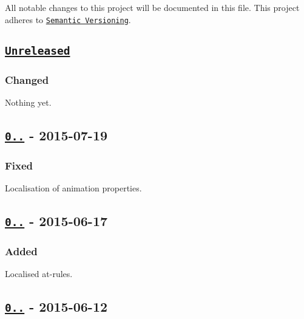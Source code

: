 All notable changes to this project will be documented in this file. This project adheres to \href{http://semver.org/}{\tt Semantic Versioning}.

\subsection*{\href{https://github.com/postcss-modules-local-by-default/compare/v0.0.10...HEAD}{\tt Unreleased}}

\subsubsection*{Changed}


\begin{DoxyItemize}
\item Nothing yet.
\end{DoxyItemize}

\subsection*{\href{https://github.com/postcss-modules-local-by-default/compare/v0.0.10...v0.0.11}{\tt 0..} -\/ 2015-\/07-\/19}

\subsubsection*{Fixed}


\begin{DoxyItemize}
\item Localisation of animation properties.
\end{DoxyItemize}

\subsection*{\href{https://github.com/postcss-modules-local-by-default/compare/v0.0.9...v0.0.10}{\tt 0..} -\/ 2015-\/06-\/17}

\subsubsection*{Added}


\begin{DoxyItemize}
\item Localised at-\/rules.
\end{DoxyItemize}

\subsection*{\href{https://github.com/postcss-modules-local-by-default/compare/v0.0.8...v0.0.9}{\tt 0..} -\/ 2015-\/06-\/12}

